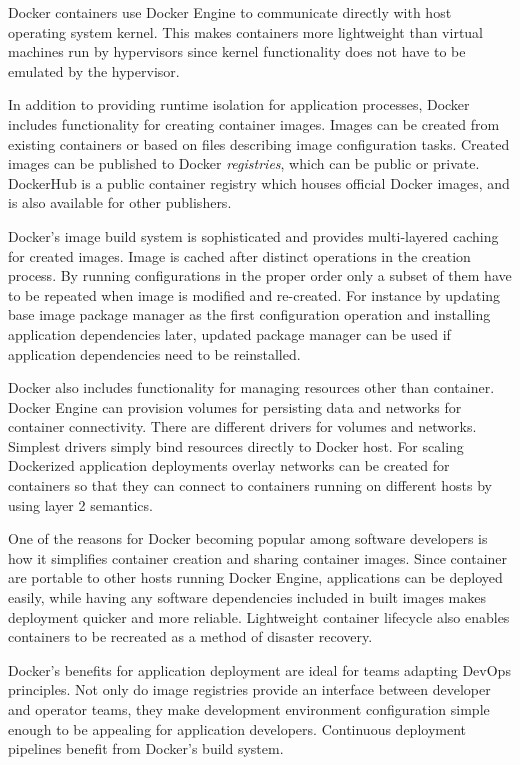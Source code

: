 Docker containers use Docker Engine to communicate directly with host operating
system kernel. This makes containers more lightweight than virtual machines run
by hypervisors since kernel functionality does not have to be emulated by the
hypervisor.

In addition to providing runtime isolation for application processes, Docker
includes functionality for creating container images. Images can be created
from existing containers or based on files describing image configuration
tasks. Created images can be published to Docker \textit{registries}, which can
be public or private. DockerHub is a public container registry which houses
official Docker images, and is also available for other publishers.

Docker's image build system is sophisticated and provides multi-layered caching
for created images. Image is cached after distinct operations in the creation
process. By running configurations in the proper order only a subset of them
have to be repeated when image is modified and re-created. For instance by
updating base image package manager as the first configuration operation and
installing application dependencies later, updated package manager can be used
if application dependencies need to be reinstalled.

Docker also includes functionality for managing resources other than container.
Docker Engine can provision volumes for persisting data and networks for
container connectivity. There are different drivers for volumes and networks.
Simplest drivers simply bind resources directly to Docker host. For scaling
Dockerized application deployments overlay networks can be created for
containers so that they can connect to containers running on different hosts by
using layer 2 semantics.

One of the reasons for Docker becoming popular among software developers is how
it simplifies container creation and sharing container images. Since container
are portable to other hosts running Docker Engine, applications can be deployed
easily, while having any software dependencies included in built images makes
deployment quicker and more reliable. Lightweight container lifecycle also
enables containers to be recreated as a method of disaster recovery.

Docker's benefits for application deployment are ideal for teams adapting
DevOps principles. Not only do image registries provide an interface between
developer and operator teams, they make development environment configuration
simple enough to be appealing for application developers. Continuous deployment
pipelines benefit from Docker's build system.


